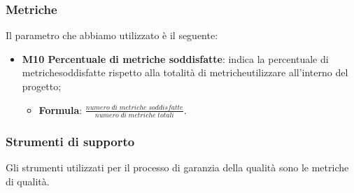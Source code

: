 \subsubsection{Metriche} 
Il parametro che abbiamo utilizzato è il seguente:
	\begin{itemize}
		\item \textbf{M10 Percentuale di metriche soddisfatte}: indica la percentuale di metriche\glosp soddisfatte rispetto alla totalità di metriche\glosp utilizzare all'interno del progetto\glo;
		\begin{itemize}
			\item[] \textbf{Formula}: $\frac{numero \; di \; metriche \; soddisfatte}{numero \; di \; metriche \; totali}$.
		\end{itemize}
	\end{itemize}
\subsubsection{Strumenti di supporto}
Gli strumenti utilizzati per il processo di garanzia della qualità sono le metriche di qualità.
